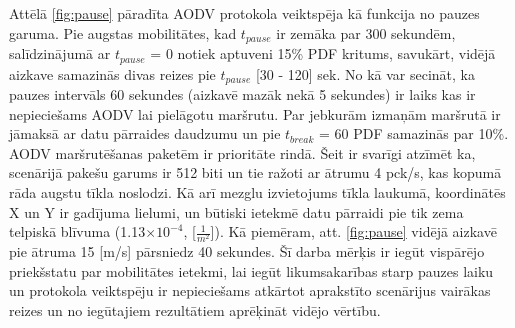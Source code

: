 Attēlā \ref{fig:pause} pāradīta AODV protokola veiktspēja kā funkcija no pauzes garuma. Pie augstas mobilitātes, kad $t_{pause}$ ir zemāka par 300 sekundēm, salīdzinājumā ar $t_{pause}$ = 0 notiek aptuveni 15\% PDF kritums, savukārt, vidējā aizkave samazinās divas reizes pie $t_{pause}$ [30 - 120] sek. No kā var secināt, ka pauzes intervāls 60 sekundes (aizkavē mazāk nekā 5 sekundes) ir laiks kas ir nepieciešams AODV lai pielāgotu maršrutu. Par jebkurām izmaņām maršrutā ir jāmaksā ar datu pārraides daudzumu un pie $t_{break}$ = 60 PDF samazinās par 10\%. AODV maršrutēšanas paketēm ir prioritāte rindā. Šeit ir svarīgi atzīmēt ka, scenārijā pakešu garums ir 512 biti un tie ražoti ar ātrumu 4 pck/s, kas kopumā rāda augstu tīkla noslodzi. Kā arī mezglu izvietojums tīkla laukumā, koordinātēs X un Y ir gadījuma lielumi, un būtiski ietekmē datu pārraidi pie tik zema telpiskā blīvuma (1.13$\times10^{-4}$, [$\frac{1}{m^{2}}$]). Kā piemēram, att. \ref{fig:pause} vidējā aizkavē pie ātruma 15 [m/s] pārsniedz 40 sekundes. Šī darba mērķis ir iegūt vispārējo priekšstatu par mobilitātes ietekmi, lai iegūt likumsakarības starp pauzes laiku un protokola veiktspēju ir nepieciešams atkārtot aprakstīto scenārijus vairākas reizes un no iegūtajiem rezultātiem aprēķināt vidējo vērtību.